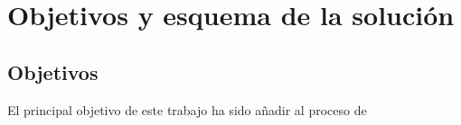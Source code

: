 \chapter{Objetivos y esquema de la solución\label{goals}}

\section{Objetivos}

El principal objetivo de este trabajo ha sido añadir al proceso de

